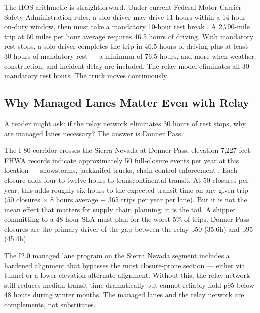 The HOS arithmetic is straightforward. Under current Federal Motor Carrier Safety Administration
rules, a solo driver may drive 11 hours within a 14-hour on-duty window, then must take a
mandatory 10-hour rest break \citep{FHWA_freight2023}. A 2,790-mile trip at 60 miles per hour
average requires 46.5 hours of driving. With mandatory rest stops, a solo driver completes
the trip in 46.5 hours of driving plus at least 30 hours of mandatory rest --- a minimum
of 76.5 hours, and more when weather, construction, and incident delay are included.
The relay model eliminates all 30 mandatory rest hours. The truck moves continuously.

\subsection{Why Managed Lanes Matter Even with Relay}

A reader might ask: if the relay network eliminates 30 hours of rest stops, why are
managed lanes necessary? The answer is Donner Pass.

The I-80 corridor crosses the Sierra Nevada at Donner Pass, elevation 7,227 feet.
FHWA records indicate approximately 50 full-closure events per year at this location ---
snowstorms, jackknifed trucks, chain control enforcement \citep{FHWA_freight2023}.
Each closure adds four to twelve hours to transcontinental transit. At 50 closures per year,
this adds roughly six hours to the expected transit time on any given trip (50 closures
$\times$ 8 hours average $\div$ 365 trips per year per lane). But it is not the mean
effect that matters for supply chain planning; it is the tail. A shipper committing to
a 48-hour SLA must plan for the worst 5\% of trips. Donner Pass closures are the primary
driver of the gap between the relay p50 (35.6h) and p95 (45.4h).

The I2.0 managed lane program on the Sierra Nevada segment includes a hardened alignment
that bypasses the most closure-prone section --- either via tunnel or a lower-elevation
alternate alignment. Without this, the relay network still reduces median transit time
dramatically but cannot reliably hold p95 below 48 hours during winter months.
The managed lanes and the relay network are complements, not substitutes.
